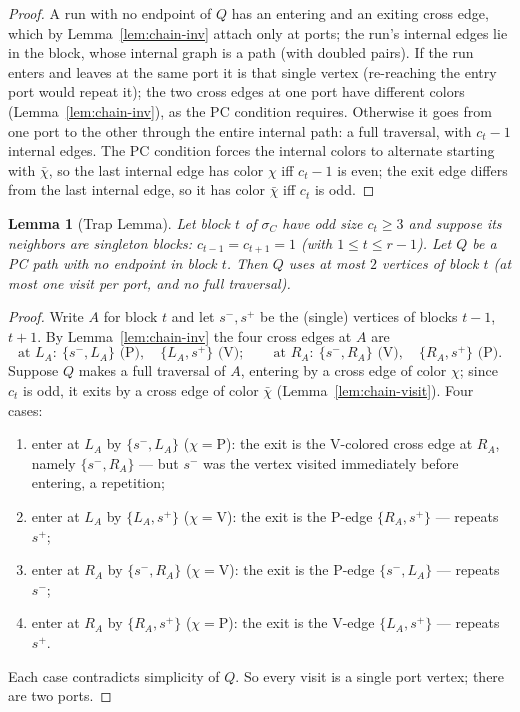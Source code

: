 \documentclass[11pt]{article}
\newtheorem{lemma}[theorem]{Lemma}
\theoremstyle{definition}
\begin{document}
\begin{proof}
A run with no endpoint of $Q$ has an entering and an exiting cross edge, which by
Lemma~\ref{lem:chain-inv} attach only at ports; the run's internal edges lie in
the block, whose internal graph is a path (with doubled pairs). If the run enters
and leaves at the same port it is that single vertex (re-reaching the entry port
would repeat it); the two cross edges at one port have different colors
(Lemma~\ref{lem:chain-inv}), as the PC condition requires. Otherwise it goes from
one port to the other through the entire internal path: a full traversal, with
$c_t - 1$ internal edges. The PC condition forces the internal colors to alternate
starting with $\bar\chi$, so the last internal edge has color $\chi$ iff
$c_t - 1$ is even; the exit edge differs from the last internal edge, so it has
color $\bar\chi$ iff $c_t$ is odd.
\end{proof}

\begin{lemma}[Trap Lemma]\label{lem:trap}
Let block $t$ of $\sigma_C$ have odd size $c_t \ge 3$ and suppose its neighbors
are singleton blocks: $c_{t-1} = c_{t+1} = 1$ (with $1 \le t \le r-1$). Let $Q$ be
a PC path with no endpoint in block $t$. Then $Q$ uses at most $2$ vertices of
block $t$ (at most one visit per port, and no full traversal).
\end{lemma}

\begin{proof}
Write $A$ for block $t$ and let $s^-, s^+$ be the (single) vertices of blocks
$t-1$, $t+1$. By Lemma~\ref{lem:chain-inv} the four cross edges at $A$ are
\[
\text{at } L_A:\ \{s^-, L_A\} \text{ (P)}, \quad \{L_A, s^+\} \text{ (V)};
\qquad
\text{at } R_A:\ \{s^-, R_A\} \text{ (V)}, \quad \{R_A, s^+\} \text{ (P)}.
\]
Suppose $Q$ makes a full traversal of $A$, entering by a cross edge of color
$\chi$; since $c_t$ is odd, it exits by a cross edge of color $\bar\chi$
(Lemma~\ref{lem:chain-visit}). Four cases:
\begin{enumerate}
\item enter at $L_A$ by $\{s^-, L_A\}$ ($\chi = \mathrm P$): the exit is the
V-colored cross edge at $R_A$, namely $\{s^-, R_A\}$ --- but $s^-$ was the vertex
visited immediately before entering, a repetition;
\item enter at $L_A$ by $\{L_A, s^+\}$ ($\chi = \mathrm V$): the exit is the
P-edge $\{R_A, s^+\}$ --- repeats $s^+$;
\item enter at $R_A$ by $\{s^-, R_A\}$ ($\chi = \mathrm V$): the exit is the
P-edge $\{s^-, L_A\}$ --- repeats $s^-$;
\item enter at $R_A$ by $\{R_A, s^+\}$ ($\chi = \mathrm P$): the exit is the
V-edge $\{L_A, s^+\}$ --- repeats $s^+$.
\end{enumerate}
Each case contradicts simplicity of $Q$. So every visit is a single port vertex;
there are two ports.
\end{proof}
\end{document}

